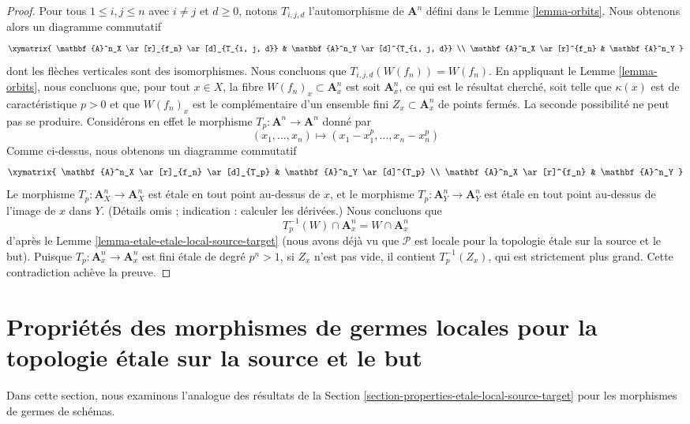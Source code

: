 \begin{proof}
\medskip\noindent
Pour tous $1 \leq i, j \leq n$ avec $i \not = j$ et $d \geq 0$, notons
$T_{i, j, d}$ l'automorphisme de $\mathbf{A}^n$ défini dans le
Lemme \ref{lemma-orbits}. Nous obtenons alors un diagramme commutatif
$$
\xymatrix{
\mathbf{A}^n_X \ar[r]_{f_n} \ar[d]_{T_{i, j, d}} &
\mathbf{A}^n_Y \ar[d]^{T_{i, j, d}} \\
\mathbf{A}^n_X \ar[r]^{f_n} & \mathbf{A}^n_Y
}
$$
dont les flèches verticales sont des isomorphismes. Nous concluons que
$T_{i, j, d}(W(f_n)) = W(f_n)$. En appliquant le Lemme \ref{lemma-orbits}, nous
concluons que, pour tout $x \in X$, la fibre
$W(f_n)_x \subset \mathbf{A}^n_x$ est soit $\mathbf{A}^n_x$, ce qui est le
résultat cherché, soit telle que $\kappa(x)$ est de caractéristique $p > 0$ et
que $W(f_n)_x$ est le complémentaire d'un ensemble fini
$Z_x \subset \mathbf{A}^n_x$ de points fermés. La seconde possibilité ne peut
pas se produire. Considérons en effet le morphisme
$T_p : \mathbf{A}^n \to \mathbf{A}^n$ donné par
$$
(x_1, \ldots, x_n) \mapsto (x_1 - x_1^p, \ldots, x_n - x_n^p)
$$
Comme ci-dessus, nous obtenons un diagramme commutatif
$$
\xymatrix{
\mathbf{A}^n_X \ar[r]_{f_n} \ar[d]_{T_p} &
\mathbf{A}^n_Y \ar[d]^{T_p} \\
\mathbf{A}^n_X \ar[r]^{f_n} & \mathbf{A}^n_Y
}
$$
Le morphisme $T_p : \mathbf{A}^n_X \to \mathbf{A}^n_X$ est \'etale en tout
point au-dessus de $x$, et le morphisme
$T_p : \mathbf{A}^n_Y \to \mathbf{A}^n_Y$ est \'etale en tout point au-dessus
de l'image de $x$ dans $Y$. (Détails omis ; indication : calculer les
dérivées.) Nous concluons que
$$
T_p^{-1}(W) \cap \mathbf{A}^n_x = W \cap \mathbf{A}^n_x
$$
d'après le Lemme \ref{lemma-etale-etale-local-source-target} (nous avons déjà
vu que $\mathcal{P}$ est locale pour la topologie \'etale sur la source et le
but). Puisque $T_p : \mathbf{A}^n_x \to \mathbf{A}^n_x$ est fini \'etale de
degré $p^n > 1$, si $Z_x$ n'est pas vide, il contient $T_p^{-1}(Z_x)$, qui est
strictement plus grand. Cette contradiction achève la preuve.
\end{proof}





\section{Propriétés des morphismes de germes locales pour la topologie étale
sur la source et le but}
\label{section-local-source-target-at-point}

\noindent
Dans cette section, nous examinons l'analogue des résultats de la
Section \ref{section-properties-etale-local-source-target}
pour les morphismes de germes de schémas.

